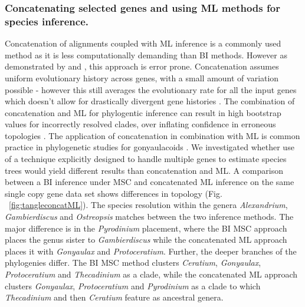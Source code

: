 \documentclass[fleqn,10pt,lineno]{wlpeerj} %
\begin{document}
\subsubsection*{Concatenating selected genes and using ML methods for species inference.}
Concatenation of alignments coupled with ML inference is a commonly used method as it is less computationally demanding than BI methods. 
However as demonstrated by \cite{kubatko2007inconsistency} and \cite{roch2015likelihood}, this approach is error prone. 
Concatenation assumes uniform evolutionary history across genes, with a small amount of variation possible - however this still averages the evolutionary rate for all the input genes which doesn't allow for drastically divergent gene histories \citep{roch2015likelihood}. 
The combination of concatenation and ML for phylogentic inference can result in high bootstrap values for incorrectly resolved clades, over inflating confidence in erroneous topologies \citep{degnan2009gene}. 
The application of concatenation in combination with ML is common practice in phylogenetic studies for gonyaulacoids  \citep{shalchian2006combined,zhang2007three,saldarriaga2004molecular,murray2005improving,hoppenrath2010dinoflagellate}.
We investigated whether use of a technique explicitly designed to handle multiple genes to estimate species trees would yield different results than concatenation and ML. 
A comparison between a BI inference under MSC and concatenated ML inference on the same single copy gene data set shows differences in topology (Fig. ~\ref{fig:tangleconcatML}). 
The species resolution within the genera \emph{Alexandrium}, \emph{Gambierdiscus} and \emph{Ostreopsis} matches between the two inference methods. 
The major difference is in the \emph{Pyrodinium} placement, where the BI MSC approach places the genus sister to \emph{Gambierdiscus} while the concatenated ML approach places it with \emph{Gonyaulax} and \emph{Protoceratium}. 
Further, the deeper branches of the phylogenies differ. 
The BI MSC method clusters \emph{Ceratium}, \emph{Gonyaulax}, \emph{Protoceratium} and \emph{Thecadinium} as a clade, while the concatenated ML approach clusters \emph{Gonyaulax}, \emph{Protoceratium} and \emph{Pyrodinium} as a clade to which \emph{Thecadinium} and then \emph{Ceratium} feature as ancestral genera. 
\end{document}
